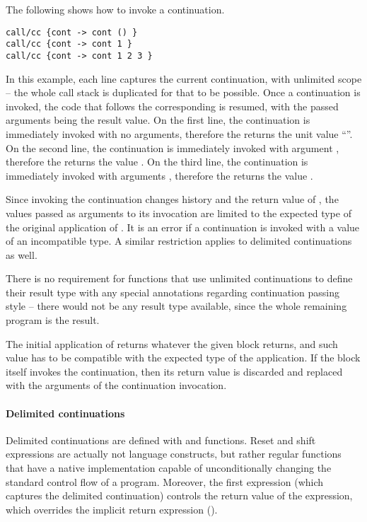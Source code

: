 \example The following shows how to invoke a continuation. 
\begin{lstlisting}
call/cc {cont -> cont () }
call/cc {cont -> cont 1 }
call/cc {cont -> cont 1 2 3 }
\end{lstlisting}
In this example, each line captures the current continuation, with unlimited scope -- the whole call stack is duplicated for that to be possible. Once a continuation is invoked, the code that follows the corresponding  is resumed, with the passed arguments being the result value. On the first line, the continuation is immediately invoked with no arguments, therefore the  returns the unit value ``\code{()}''. On the second line, the continuation is immediately invoked with argument , therefore the  returns the value . On the third line, the continuation is immediately invoked with arguments , therefore the  returns the value . 

Since invoking the continuation changes history and the return value of , the values passed as arguments to its invocation are limited to the expected type of the original application of . It is an error if a continuation is invoked with a value of an incompatible type. A similar restriction applies to delimited continuations as well. 

There is no requirement for functions that use unlimited continuations to define their result type with any special annotations regarding continuation passing style -- there would not be any result type available, since the whole remaining program is the result. 

The initial application of  returns whatever the given block returns, and such value has to be compatible with the expected type of the  application. If the block itself invokes the continuation, then its return value is discarded and replaced with the arguments of the continuation invocation. 







\paragraph{Delimited continuations}

Delimited continuations are defined with  and  functions. Reset and shift expressions are actually not language constructs, but rather regular functions that have a native implementation capable of unconditionally changing the standard control flow of a program. Moreover, the first  expression (which captures the delimited continuation) controls the return value of the  expression, which overrides the implicit return expression ().

